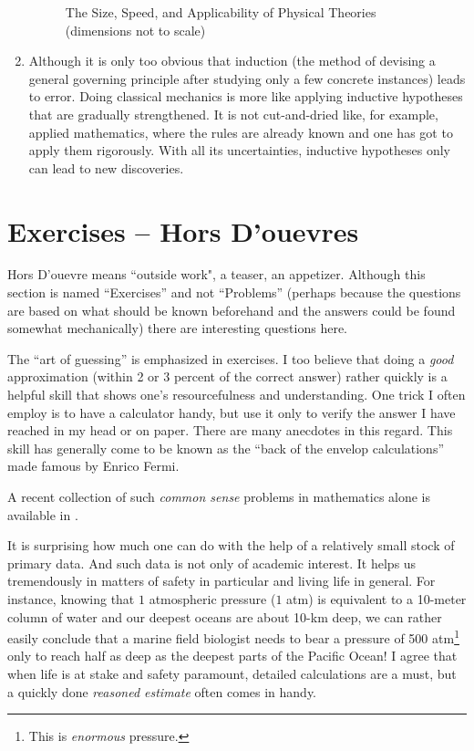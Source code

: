 \documentclass[12pt,a4paper]{book}
\newcounter{problem}[chapter] %
\begin{document}
\begin{enumerate}
\begin{figure}[h!]
            \caption{The Size, Speed, and Applicability of Physical Theories (dimensions not to scale)}
            \label{fig: size-speed}
        \end{figure}
    \item Although it is only too obvious that induction (the method of devising a general governing principle after studying only a few concrete instances) leads to error. Doing classical mechanics is more like applying inductive hypotheses that are gradually strengthened. It is not cut-and-dried like, for example, applied mathematics, where the rules are already known and one has got to apply them rigorously. With all its uncertainties, inductive hypotheses only can lead to new discoveries.
\end{enumerate}

\section{Exercises -- Hors D'ouevres}

Hors D'ouevre means ``outside work", a teaser, an appetizer. Although this section is named ``Exercises'' and not ``Problems'' (perhaps because the questions are based on what should be known beforehand and the answers could be found somewhat mechanically) there are interesting questions here.

The ``art of guessing'' \cite{polya-guessing} is emphasized in exercises. I too believe that doing a \emph{good} approximation (within 2 or 3 percent of the correct answer) rather quickly is a helpful skill that shows one's resourcefulness and understanding. One trick I often employ is to have a calculator handy, but use it only to verify the answer I have reached in my head or on paper. There are many anecdotes in this regard. This skill has generally come to be known as the ``back of the envelop calculations'' made famous by Enrico Fermi.

A recent collection of such \emph{common sense} problems in mathematics alone is available in \cite{cosm}.

It is surprising how much one can do with the help of a relatively small stock of primary data. And such data is not only of academic interest. It helps us tremendously in matters of safety in particular and living life in general. For instance, knowing that $1$ atmospheric pressure ($1$ atm) is equivalent to a 10-meter column of water and our deepest oceans are about 10-km deep, we can rather easily conclude that a marine field biologist needs to bear a pressure of 500 atm\footnote{This is \emph{enormous} pressure.} only to reach half as deep as the deepest parts of the Pacific Ocean! I agree that when life is at stake and safety paramount, detailed calculations are a must, but a quickly done \emph{reasoned estimate} often comes in handy.
\end{document}
